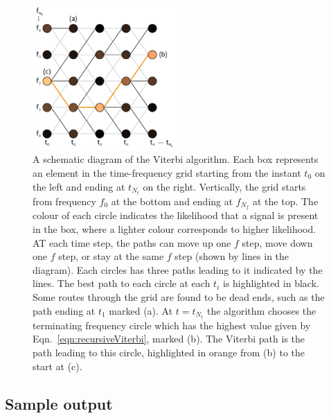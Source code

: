 \documentclass[paper-main.tex]{subfiles}
\begin{document}
\begin{figure}
\includegraphics[width=0.49\textwidth]{figures/viterbiDiagram.pdf}
\caption{\label{fig:viterbi}
A schematic diagram of the Viterbi algorithm. 
Each box represents an element in the time-frequency grid starting from the instant $t_0$ on the left and ending at $t_{N_t}$ on the right. 
Vertically, the grid starts from frequency $f_0$ at the bottom and ending at $f_{N_f}$ at the top. 
The colour of each circle indicates the likelihood that a signal is present in the box, where a lighter colour corresponds to higher likelihood. 
AT each time step, the paths can move up one $f$ step, move down one $f$ step, or stay at the same $f$ step (shown by lines in the diagram). 
Each circles has three paths leading to it indicated by the lines. 
The best path to each circle at each $t_i$ is highlighted in black. 
Some routes through the grid are found to be dead ends, such as the path ending at $t_1$ marked (a). 
At $t=t_{N_t}$ the algorithm chooses the terminating frequency circle which has the highest value given by Eqn.~\ref{eqn:recursiveViterbi}, marked (b). 
The Viterbi path is the path leading to this circle, highlighted in orange from (b) to the start at (c). 
}
\end{figure}



\subsection{Sample output}
\label{sec:wanderingResults}
\end{document}

